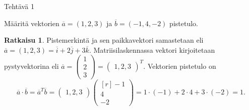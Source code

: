 \documentclass[12pt, a4paper, t]{beamer}
\date{}
\theoremstyle{exercise}
\theoremstyle{remark}
\theoremstyle{definition}
\renewcommand{\bar}[1]{\overline{#1}}
\newtheorem*{rat}{Ratkaisu}
\begin{document}


%
\begin{frame}{Tehtävä 1}

\vspace{12pt}
\begin{tcolorbox}Määritä vektorien $\bar{a}=(1, 2, 3)$ ja $\bar{b}=(-1, 4, -2)$ pistetulo.\end{tcolorbox}

\vspace{100pt}

\begin{rat}
Pistemerkintä ja sen paikkavektori samastetaan eli $\bar{a}=(1, 2, 3)=\bar{i}+2\bar{j}+3\bar{k}.$ Matriisilaskennassa vektori kirjoitetaan pystyvektorina eli
$
\bar{a}=\begin{pmatrix}
1\\
2\\
3
\end{pmatrix}=\begin{pmatrix}
1, 2, 3\end{pmatrix}^T.
$
Vektorien pistetulo on
$$
\bar{a}\cdot \bar{b}=\bar{a}^T\bar{b}=\begin{pmatrix} 1, 2, 3\end{pmatrix}\begin{pmatrix*}[r]
-1\\
4\\
-2
\end{pmatrix*}=1\cdot(-1)+2\cdot 4+3\cdot(-2)=1.
$$

\end{rat}
\end{frame}
\end{document}
